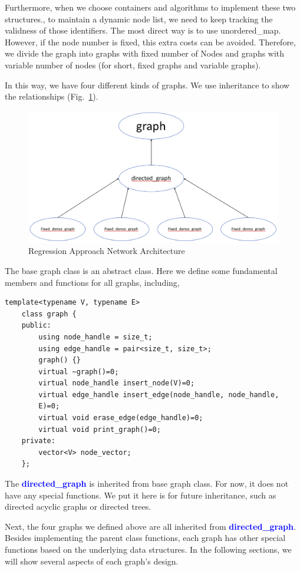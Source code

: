 \documentclass[]{article}
\begin{document}
Furthermore, when we choose containers and algorithms to implement these two structures., to maintain a dynamic node list, we need to keep tracking the validness of those identifiers. The most direct way is to use unordered\_map. However, if the node number is fixed, this extra costs can be avoided. Therefore, we divide the graph into graphs with fixed number of Nodes and graphs with variable number of nodes (for short, fixed graphs and variable graphs).

In this way, we have four different kinds of graphs. We use inheritance to show the relationships (Fig.~\ref{fig:graph}).
\begin{figure}
	\centering
	\includegraphics[scale=0.4]{graph.png}
	\caption{Regression Approach Network Architecture}
	
	\label{fig:graph}
\end{figure}
The base graph class is an abstract class. Here we define some fundamental members and functions for all graphs, including,
\begin{lstlisting}
template<typename V, typename E>
    class graph {        
    public:     
        using node_handle = size_t;
        using edge_handle = pair<size_t, size_t>;   
        graph() {}
        virtual ~graph()=0;
        virtual node_handle insert_node(V)=0;
        virtual edge_handle insert_edge(node_handle, node_handle, 
        E)=0;
        virtual void erase_edge(edge_handle)=0;
        virtual void print_graph()=0;
    private:
        vector<V> node_vector;
    };
\end{lstlisting}
The \textbf{\textcolor{blue}{directed\_graph}} is inherited from base graph class. For now, it does not have any special functions. We put it here is for future inheritance, such as directed acyclic graphs or directed trees.

Next, the four graphs we defined above are all inherited from \textbf{\textcolor{blue}{directed\_graph}}. Besides implementing the parent class functions, each graph has other special functions based on the underlying data structures. In the following sections, we will show several aspects of each graph's design.
\end{document}
